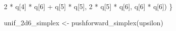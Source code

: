 \documentclass[
  letterpaper,
  DIV=11,
  numbers=noendperiod]{scrartcl}
\newenvironment{Shaded}{\begin{snugshade}}{\end{snugshade}}
\newcommand{\DecValTok}[1]{\textcolor[rgb]{0.68,0.00,0.00}{#1}}
\newcommand{\FunctionTok}[1]{\textcolor[rgb]{0.28,0.35,0.67}{#1}}
\newcommand{\NormalTok}[1]{\textcolor[rgb]{0.00,0.23,0.31}{#1}}
\newcommand{\OtherTok}[1]{\textcolor[rgb]{0.00,0.23,0.31}{#1}}
\newcommand{\SpecialCharTok}[1]{\textcolor[rgb]{0.37,0.37,0.37}{#1}}
\begin{document}
\begin{Shaded}
\begin{Highlighting}[]
    \DecValTok{2} \SpecialCharTok{*}\NormalTok{ q[}\DecValTok{4}\NormalTok{] }\SpecialCharTok{*}\NormalTok{ q[}\DecValTok{6}\NormalTok{] }\SpecialCharTok{+}\NormalTok{     q[}\DecValTok{5}\NormalTok{] }\SpecialCharTok{*}\NormalTok{ q[}\DecValTok{5}\NormalTok{],}
    \DecValTok{2} \SpecialCharTok{*}\NormalTok{ q[}\DecValTok{5}\NormalTok{] }\SpecialCharTok{*}\NormalTok{ q[}\DecValTok{6}\NormalTok{],}
\NormalTok{        q[}\DecValTok{6}\NormalTok{] }\SpecialCharTok{*}\NormalTok{ q[}\DecValTok{6}\NormalTok{])}
\NormalTok{\}}
\end{Highlighting}
\end{Shaded}

\begin{Shaded}
\begin{Highlighting}[]
\NormalTok{unif\_2d6\_simplex }\OtherTok{\textless{}{-}} \FunctionTok{pushforward\_simplex}\NormalTok{(upsilon)}
\end{Highlighting}
\end{Shaded}
\end{document}
